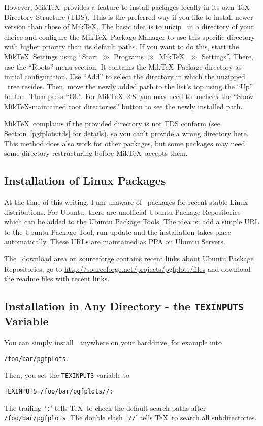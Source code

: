 However, Mik\TeX\ provides a feature to install packages locally in its own \TeX-Directory-Structure (TDS). This is the preferred way if you like to install newer version than those of Mik\TeX. The basic idea is to unzip \PGFPlots\ in a directory of your choice and configure the Mik\TeX\ Package Manager to use this specific directory with higher priority than its default paths. If you want to do this, start the Mik\TeX\ Settings using ``Start $\gg$ Programs $\gg$ Mik\TeX\ $\gg$ Settings''. There, use the ``Roots'' menu section. It contains the Mik\TeX\ Package directory as initial configuration. Use ``Add'' to select the directory in which the unzipped \PGFPlots\ tree resides. Then, move the newly added path to the list's top using the ``Up'' button. Then press ``Ok''. For Mik\TeX\ 2.8, you may need to uncheck the ``Show Mik\TeX-maintained root directories'' button to see the newly installed path.

Mik\TeX\ complains if the provided directory is not TDS conform (see Section~\ref{pgfplots:tds} for details), so you can't provide a wrong directory here. This method does also work for other packages, but some packages may need some directory restructuring before Mik\TeX\ accepts them.

\subsection{Installation of Linux Packages}
At the time of this writing, I am unaware of \PGFPlots\ packages for recent stable Linux distributions. For Ubuntu, there are unofficial Ubuntu Package Repositories which can be added to the Ubuntu Package Tools. The idea is: add a simple URL to the Ubuntu Package Tool, run update and the installation takes place automatically. These URLs are maintained as PPA on Ubuntu Servers.

The \PGFPlots\ download area on sourceforge contains recent links about Ubuntu Package Repositories, go to 
\url{http://sourceforge.net/projects/pgfplots/files} 
and download the readme files with recent links.


\subsection{Installation in Any Directory - the \texttt{TEXINPUTS} Variable}
You can simply install \PGFPlots\ anywhere on your harddrive, for example into
\begin{verbatim}
/foo/bar/pgfplots.
\end{verbatim}
Then, you set the \texttt{TEXINPUTS} variable to
\begin{verbatim}
TEXINPUTS=/foo/bar/pgfplots//:
\end{verbatim}
The trailing~`\texttt{:}' tells \TeX\ to check the default search paths after \lstinline!/foo/bar/pgfplots!. The double slash~`\texttt{//}' tells \TeX\ to search all subdirectories.

